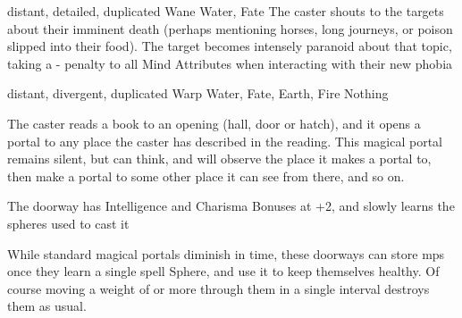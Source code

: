   {distant, detailed, duplicated}%
  {Wane}%
  {Water, Fate}%
  {}%
  {The caster shouts to the targets about their imminent death (perhaps mentioning horses, long journeys, or poison slipped into their food).
    The target becomes intensely paranoid about that topic, taking a - penalty to all Mind Attributes when interacting with their new phobia}%
  {}

  {distant, divergent, duplicated}%
  {Warp}%
  {Water, Fate, Earth, Fire}%
  {Nothing}%
  {The caster reads a book to an opening (hall, door or hatch), and it opens a portal to any place the caster has described in the reading.
  This magical portal remains silent, but can think, and will observe the place it makes a portal to, then make a portal to some other place it can see from there, and so on.

  The doorway has Intelligence and Charisma Bonuses at +2, and slowly learns the spheres used to cast it}%
  {
  While standard magical portals diminish in time, these doorways can store \glspl{mp} once they learn a single spell Sphere, and use it to keep themselves healthy.
  Of course moving a \gls{weight} of  or more through them in a single \gls{interval} destroys them as usual.}
